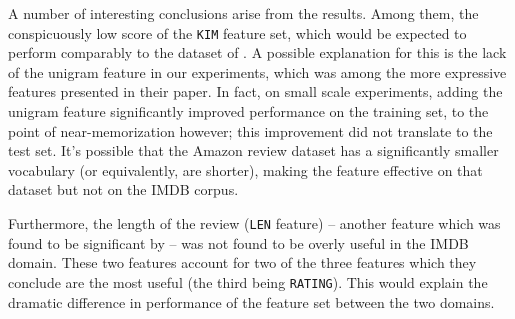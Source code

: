 \documentclass[letter,10pt]{article}
\begin{document}
\begin{table}
\begin{center}
\caption{\label{tab:results}
	Pearson correlation for different feature sets (see ).
}
\end{center}
\end{table}


A number of interesting conclusions arise from the results.
Among them, the conspicuously low score of the {\tt KIM} feature
	set, which would be expected to perform comparably to
	the dataset of .
A possible explanation for this is the lack of the unigram feature
	in our experiments, which was among the more expressive features
	presented in their paper.
In fact, on small scale experiments, adding the unigram feature significantly
	improved performance on the training set, to the point of near-memorization
	however; this improvement did not translate to the test set.
It's possible that the Amazon review dataset has a significantly smaller
	vocabulary (or equivalently, are shorter), making the feature effective
	on that dataset but not on the IMDB corpus.

Furthermore, the length of the review ({\tt LEN} feature) -- another feature
	which was found to be significant by  --
	was not found to be overly useful in the IMDB domain.
These two features account for two of the three features which they conclude
	are the most useful (the third being {\tt RATING}).
This would explain
	the dramatic difference in performance of the feature set between
	the two domains.
\end{document}
